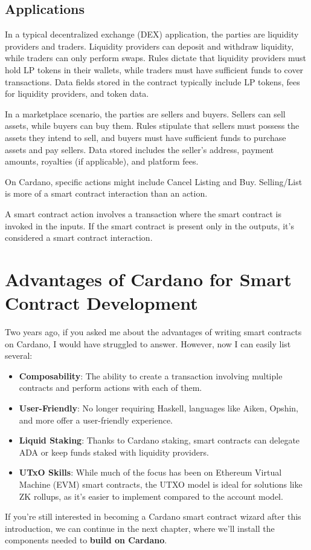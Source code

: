 \subsection{Applications}

In a typical decentralized exchange (DEX) application, the parties are liquidity providers and traders. Liquidity providers can deposit and withdraw liquidity, while traders can only perform swaps. Rules dictate that liquidity providers must hold LP tokens in their wallets, while traders must have sufficient funds to cover transactions. Data fields stored in the contract typically include LP tokens, fees for liquidity providers, and token data.

In a marketplace scenario, the parties are sellers and buyers. Sellers can sell assets, while buyers can buy them. Rules stipulate that sellers must possess the assets they intend to sell, and buyers must have sufficient funds to purchase assets and pay sellers. Data stored includes the seller's address, payment amounts, royalties (if applicable), and platform fees.

On Cardano, specific actions might include Cancel Listing and Buy. Selling/List is more of a smart contract interaction than an action.

\begin{remark}
A smart contract action involves a transaction where the smart contract is invoked in the inputs. If the smart contract is present only in the outputs, it's considered a smart contract interaction.
\end{remark}

\section{Advantages of Cardano for Smart Contract Development}

Two years ago, if you asked me about the advantages of writing smart contracts on Cardano, I would have struggled to answer. However, now I can easily list several:

\begin{itemize}
\item \textbf{Composability}: The ability to create a transaction involving multiple contracts and perform actions with each of them.
\item \textbf{User-Friendly}: No longer requiring Haskell, languages like Aiken, Opshin, and more offer a user-friendly experience.
\item \textbf{Liquid Staking}: Thanks to Cardano staking, smart contracts can delegate ADA or keep funds staked with liquidity providers.
\item \textbf{UTxO Skills}: While much of the focus has been on Ethereum Virtual Machine (EVM) smart contracts, the UTXO model is ideal for solutions like ZK rollups, as it's easier to implement compared to the account model.
\end{itemize}

If you're still interested in becoming a Cardano smart contract wizard after this introduction, we can continue in the next chapter, where we'll install the components needed to \textbf{build on Cardano}.
